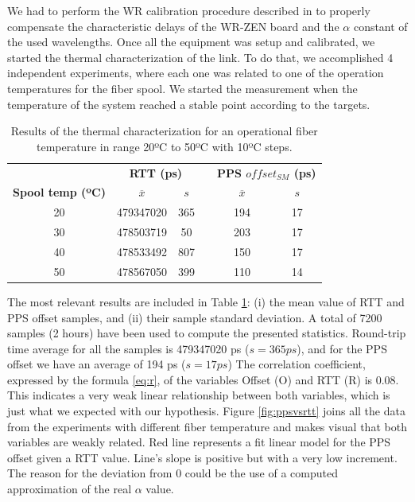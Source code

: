 We had to perform the WR calibration procedure described in \cite{man:calib} to 
properly compensate the characteristic delays of the WR-ZEN board and the 
$\alpha$ constant of the used wavelengths. Once all the equipment was setup and 
calibrated, we started the thermal characterization of the link. To do that, we 
accomplished 4 independent experiments, where each one was related to one of 
the operation temperatures for the fiber spool. We started the measurement when 
the temperature of the system reached a stable point according to the targets. 

\begin{table}\centering
	\begin{tabular}{@{} cccccc@{}}%
		& \multicolumn{2}{c}{\bfseries{RTT (ps)}} & &
		\multicolumn{2}{c}{\bfseries{PPS $offset_{SM}$ (ps)}} \\
		\cmidrule(l){2-3}  \cmidrule{5-6}
		\textbf{Spool temp (ºC)} & $\overline{x}$ & $s$ & & $\overline{x}$ 
		& $s$ \\ \midrule
	\small{20} & 479347020 & 365 & & 194 & 17 \\
	\small{30} & 478503719 & 50  & & 203 & 17 \\
	\small{40} & 478533492 & 807 & & 150 & 17 \\
	\small{50} & 478567050 & 399 & & 110 & 14 \\
	\bottomrule
	\end{tabular}
	\caption{Results of the thermal characterization for an operational fiber 
		temperature in range 20ºC to 50ºC with 10ºC steps.}
	\label{tab:temp}
\end{table}

The most relevant results are included in Table \ref{tab:temp}: (i) the mean 
value of RTT and PPS offset samples, and (ii) their sample standard deviation. 
A total of 7200 samples (2 hours) have been used to compute the presented 
statistics. Round-trip time average for all the samples is 479347020 ps ($s=365 
ps$), and for the PPS offset we have an average of 194 ps ($s=17 ps$)
The correlation coefficient, expressed by the formula \ref{eq:r}, of the 
variables Offset (O) and RTT (R) is 0.08. This indicates a very weak linear 
relationship between both variables, which is just what we expected with our 
hypothesis.
Figure \ref{fig:ppsvsrtt} joins all the data from the experiments with 
different fiber temperature and makes visual that both variables are weakly 
related. Red line represents a fit linear model for the PPS offset given a RTT 
value. Line's slope is positive but with a very low increment. The reason for 
the deviation from 0 could be the use of a computed approximation of the real 
$\alpha$ value. 

